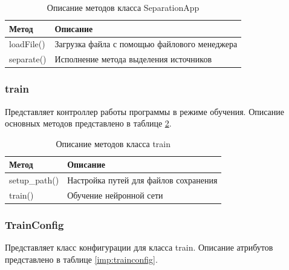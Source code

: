 \begin{table}[h]
	\caption{\label{imp:app}Описание методов класса SeparationApp}
	\begin{center}
		\begin{tabular}{|p{}|p{}|}
			\hline
			Метод & Описание \\
			\hline
			loadFile() & Загрузка файла с помощью файлового менеджера \\	
			\hline
			separate() & Исполнение метода выделения источников \\
			\hline
		\end{tabular}
	\end{center}
\end{table} 

\subsubsection*{train}

Представляет контроллер работы программы в режиме обучения. Описание основных методов представлено в таблице \ref{imp:train-}.

\begin{table}[h]
	\caption{\label{imp:train-}Описание методов класса train}
	\begin{center}
		\begin{tabular}{|p{}|p{}|}
			\hline
			Метод & Описание \\
			\hline
			setup\_path() & Настройка путей для файлов сохранения \\	
			\hline
			train() & Обучение нейронной сети \\
			\hline
		\end{tabular}
	\end{center}
\end{table} 

\subsubsection*{TrainConfig}

Представляет класс конфигурации для класса train. Описание атрибутов представлено в таблице \ref{imp:trainconfig}.

